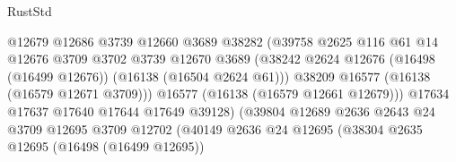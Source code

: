 \begin{lexlean}{RustStd}
\begin{coremodule}
                                            @12679
                                            @12686
                                            @3739
                                            @12660
                                            @3689
                                            @38282
                                            (@39758
                                              @2625
                                              @116
                                              @61
                                              @14
                                              @12676
                                              @3709
                                              @3702
                                              @3739
                                              @12670
                                              @3689
                                              (@38242
                                                @2624
                                                @12676
                                                (@16498 (@16499 @12676))
                                                (@16138 (@16504 @2624 @61)))
                                              @38209
                                              @16577
                                              (@16138 (@16579 @12671 @3709)))
                                            @16577
                                            (@16138 (@16579 @12661 @12679)))
                                          @17634
                                          @17637
                                          @17640
                                          @17644
                                          @17649
                                          @39128)
                                        (@39804
                                          @12689
                                          @2636
                                          @2643
                                          @24
                                          @3709
                                          @12695
                                          @3709
                                          @12702
                                          (@40149
                                            @2636
                                            @24
                                            @12695
                                            (@38304
                                              @2635
                                              @12695
                                              (@16498 (@16499 @12695))

\end{coremodule}
\end{lexlean}

